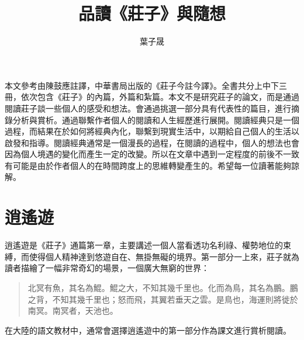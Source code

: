 \documentclass[12pt,a4paper]{article}
\begin{document}
    \title{品讀《莊子》與隨想}
    \author{葉子晟}
    \date{}
    \maketitle
    
    \small
    本文參考由陳鼓應註譯，中華書局出版的《莊子今註今譯》。全書共分上中下三冊，依次包含《莊子》的內篇，外篇和紮篇。本文不是研究莊子的論文，而是通過閱讀莊子談一些個人的感受和想法。會通過挑選一部分具有代表性的篇目，進行摘錄分析與賞析。通過聯繫作者個人的閱讀和人生經歷進行展開。閱讀經典只是一個過程，而結果在於如何將經典內化，聯繫到現實生活中，以期給自己個人的生活以啟發和指導。閱讀經典通常是一個漫長的過程，在閱讀的過程中，個人的想法也會因為個人境遇的變化而產生一定的改變。所以在文章中遇到一定程度的前後不一致有可能是由於作者個人的在時間跨度上的思維轉變產生的。希望每一位讀著能夠諒解。

    \normalsize

    \section{逍遙遊}
    逍遙遊是《莊子》通篇第一章，主要講述一個人當看透功名利祿、權勢地位的束縛，而使得個人精神達到悠遊自在、無掛無礙的境界。第一部分一上來，莊子就為讀者描繪了一幅非常奇幻的場景，一個廣大無窮的世界：
    \begin{quotation}
        北冥有魚，其名為鯤。鯤之大，不知其幾千里也。化而為鳥，其名為鵬。鵬之背，不知其幾千里也；怒而飛，其翼若垂天之雲。是鳥也，海運則將徙於南冥。南冥者，天池也。
    \end{quotation}
    在大陸的語文教材中，通常會選擇逍遙遊中的第一部分作為課文進行賞析閱讀。

\end{document}
